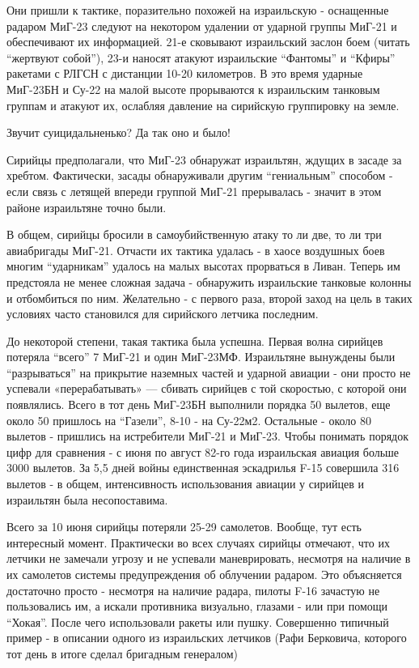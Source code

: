 Они пришли к тактике, поразительно похожей на израильскую - оснащенные радаром МиГ-23 следуют на некотором удалении от ударной группы МиГ-21 и обеспечивают их информацией. 21-е сковывают израильский заслон боем (читать “жертвуют собой”), 23-и наносят атакуют израильские “Фантомы” и “Кфиры” ракетами с РЛГСН с дистанции 10-20 километров. В это время ударные МиГ-23БН и Су-22 на малой высоте прорываются к израильским танковым группам и атакуют их, ослабляя давление на сирийскую группировку на земле.

Звучит суицидальненько? Да так оно и было!

Сирийцы предполагали, что МиГ-23 обнаружат израильтян, ждущих в засаде за хребтом. Фактически, засады обнаруживали другим “гениальным” способом - если связь с летящей впереди группой МиГ-21 прерывалась - значит в этом районе израильтяне точно были.

В общем, сирийцы бросили в самоубийственную атаку то ли две, то ли три авиабригады МиГ-21. Отчасти их тактика удалась - в хаосе воздушных боев многим “ударникам” удалось на малых высотах прорваться в Ливан. Теперь им предстояла не менее сложная задача - обнаружить израильские танковые колонны и отбомбиться по ним. Желательно - с первого раза, второй заход на цель в таких условиях часто становился для сирийского летчика последним.

До некоторой степени, такая тактика была успешна. Первая волна сирийцев потеряла “всего” 7 МиГ-21 и один МиГ-23МФ. Израильтяне вынуждены были “разрываться” на прикрытие наземных частей и ударной авиации - они просто не успевали «перерабатывать» — сбивать сирийцев с той скоростью, с которой они появлялись. Всего в тот день МиГ-23БН выполнили порядка 50 вылетов, еще около 50 пришлось на “Газели”, 8-10 - на Су-22м2. Остальные - около 80 вылетов - пришлись на истребители МиГ-21 и МиГ-23. Чтобы понимать порядок цифр для сравнения - с июня по август 82-го года израильская авиация больше 3000 вылетов. За 5,5 дней войны единственная эскадрилья F-15 совершила 316 вылетов - в общем, интенсивность использования авиации у сирийцев и израильтян была несопоставима.

Всего за 10 июня сирийцы потеряли 25-29 самолетов. Вообще, тут есть интересный момент. Практически во всех случаях сирийцы отмечают, что их летчики не замечали угрозу и не успевали маневрировать, несмотря на наличие в их самолетов системы предупреждения об облучении радаром. Это объясняется достаточно просто - несмотря на наличие радара, пилоты F-16 зачастую не пользовались им, а искали противника визуально, глазами - или при помощи “Хокая”. После чего использовали ракеты или пушку. Совершенно типичный пример - в описании одного из израильских летчиков (Рафи Берковича, которого тот день в итоге сделал бригадным генералом)


